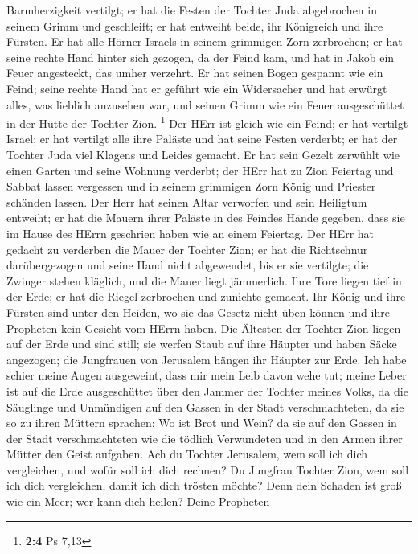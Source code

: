 Barmherzigkeit vertilgt; er hat die Festen der Tochter Juda abgebrochen
in seinem Grimm und geschleift; er hat entweiht beide, ihr Königreich
und ihre Fürsten.  Er hat alle Hörner Israels in seinem
grimmigen Zorn zerbrochen; er hat seine rechte Hand hinter sich gezogen,
da der Feind kam, und hat in Jakob ein Feuer angesteckt, das umher
verzehrt.  Er hat seinen Bogen gespannt wie ein Feind; seine
rechte Hand hat er geführt wie ein Widersacher und hat erwürgt alles,
was lieblich anzusehen war, und seinen Grimm wie ein Feuer ausgeschüttet
in der Hütte der Tochter Zion. \footnote{\textbf{2:4} Ps 7,13}
 Der HErr ist gleich wie ein Feind; er hat vertilgt Israel;
er hat vertilgt alle ihre Paläste und hat seine Festen verderbt; er hat
der Tochter Juda viel Klagens und Leides gemacht.  Er hat
sein Gezelt zerwühlt wie einen Garten und seine Wohnung verderbt; der
HErr hat zu Zion Feiertag und Sabbat lassen vergessen und in seinem
grimmigen Zorn König und Priester schänden lassen.  Der Herr
hat seinen Altar verworfen und sein Heiligtum entweiht; er hat die
Mauern ihrer Paläste in des Feindes Hände gegeben, dass sie im Hause des
HErrn geschrien haben wie an einem Feiertag.  Der HErr hat
gedacht zu verderben die Mauer der Tochter Zion; er hat die Richtschnur
darübergezogen und seine Hand nicht abgewendet, bis er sie vertilgte;
die Zwinger stehen kläglich, und die Mauer liegt jämmerlich.
 Ihre Tore liegen tief in der Erde; er hat die Riegel
zerbrochen und zunichte gemacht. Ihr König und ihre Fürsten sind unter
den Heiden, wo sie das Gesetz nicht üben können und ihre Propheten kein
Gesicht vom HErrn haben.  Die Ältesten der Tochter Zion
liegen auf der Erde und sind still; sie werfen Staub auf ihre Häupter
und haben Säcke angezogen; die Jungfrauen von Jerusalem hängen ihr
Häupter zur Erde.  Ich habe schier meine Augen ausgeweint,
dass mir mein Leib davon wehe tut; meine Leber ist auf die Erde
ausgeschüttet über den Jammer der Tochter meines Volks, da die Säuglinge
und Unmündigen auf den Gassen in der Stadt verschmachteten,
 da sie so zu ihren Müttern sprachen: Wo ist Brot und Wein?
da sie auf den Gassen in der Stadt verschmachteten wie die tödlich
Verwundeten und in den Armen ihrer Mütter den Geist aufgaben.
 Ach du Tochter Jerusalem, wem soll ich dich vergleichen,
und wofür soll ich dich rechnen? Du Jungfrau Tochter Zion, wem soll ich
dich vergleichen, damit ich dich trösten möchte? Denn dein Schaden ist
groß wie ein Meer; wer kann dich heilen?  Deine Propheten
